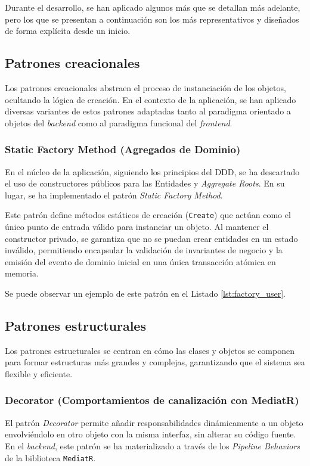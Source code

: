 Durante el desarrollo, se han aplicado algunos más que se detallan más adelante, pero los que se presentan a continuación son los más representativos y diseñados de forma explícita desde un inicio.

\subsection{Patrones creacionales}
Los patrones creacionales abstraen el proceso de instanciación de los objetos, ocultando la lógica de creación. En el contexto de la aplicación, se han aplicado diversas variantes de estos patrones adaptadas tanto al paradigma orientado a objetos del \emph{backend} como al paradigma funcional del \emph{frontend}.

\subsubsection{Static Factory Method (Agregados de Dominio)}
En el núcleo de la aplicación, siguiendo los principios del \ac{DDD}, se ha descartado el uso de constructores públicos para las Entidades y \emph{Aggregate Roots}. En su lugar, se ha implementado el patrón \emph{Static Factory Method}. 

Este patrón define métodos estáticos de creación (\texttt{Create}) que actúan como el único punto de entrada válido para instanciar un objeto. Al mantener el constructor privado, se garantiza que no se puedan crear entidades en un estado inválido, permitiendo encapsular la validación de invariantes de negocio y la emisión del evento de dominio inicial en una única transacción atómica en memoria.

Se puede observar un ejemplo de este patrón en el Listado \ref{lst:factory_user}.

\subsection{Patrones estructurales}
Los patrones estructurales se centran en cómo las clases y objetos se componen para formar estructuras más grandes y complejas, garantizando que el sistema sea flexible y eficiente.

\subsubsection{Decorator (Comportamientos de canalización con MediatR)}
El patrón \emph{Decorator} permite añadir responsabilidades dinámicamente a un objeto envolviéndolo en otro objeto con la misma interfaz, sin alterar su código fuente. En el \emph{backend}, este patrón se ha materializado a través de los \emph{Pipeline Behaviors} de la biblioteca \texttt{MediatR}.

